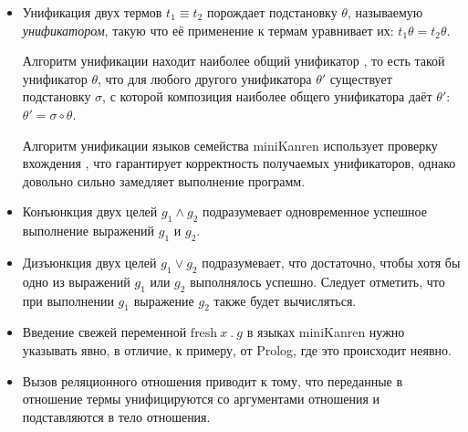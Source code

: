 \begin{itemize}
\item Унификация двух термов $t_1 \equiv t_2$ порождает подстановку $\theta$, называемую \emph{унификатором},
      такую что её применение к термам уравнивает их: $t_1 \theta = t_2 \theta$.

      Алгоритм унификации находит наиболее общий унификатор , то есть такой
      унификатор $\theta$, что для любого другого унификатора $\theta'$ существует подстановку $\sigma$,
      с которой композиция наиболее общего унификатора даёт $\theta'$: $\theta' = \sigma \circ \theta$\cite{unification}.

      Алгоритм унификации языков семейства miniKanren использует проверку вхождения ,
      что гарантирует корректность получаемых унификаторов, однако довольно сильно замедляет выполнение программ.

\item Конъюнкция двух целей $g_1 \land g_2$ подразумевает одновременное успешное выполнение выражений $g_1$ и $g_2$.
\item Дизъюнкция двух целей $g_1 \lor g_2$ подразумевает, что достаточно, чтобы хотя бы одно из выражений $g_1$ или $g_2$ выполнялось успешно.
      Следует отметить, что при выполнении $g_1$ выражение $g_2$ также будет вычисляться.
\item Введение свежей переменной $\text{fresh}\ x\ .\ g$ в языках miniKanren нужно указывать явно, в отличие, к примеру,
      от Prolog, где это происходит неявно.
\item Вызов реляционного отношения приводит к тому, что переданные в отношение термы
      унифицируются со аргументами отношения и подставляются в тело отношения. 
\end{itemize}
